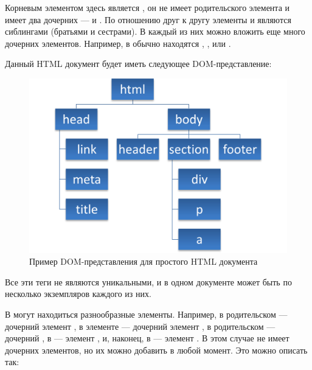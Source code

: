 
Корневым элементом здесь является , он не имеет родительского элемента и имеет два дочерних ---  и . По отношению друг к другу элементы  и  являются сиблингами (братьями и сестрами). В каждый из них можно вложить еще много дочерних элементов. Например, в  обычно находятся , ,  или .

Данный HTML документ будет иметь следующее DOM-представление:
 \clearpage

\begin{figure}[h]
	\centering
	\includegraphics[width=150mm]{img/simple-dom-1.png}
	\caption{Пример DOM-представления для простого HTML документа}
	\label{fig:simple-dom-1}
\end{figure}

Все эти теги не являются уникальными, и в одном документе может быть по несколько экземпляров каждого из них.

В  могут находиться разнообразные элементы. 
Например, в родительском  --- дочерний элемент , в элементе  --- дочерний элемент , в родительском  --- дочерний , в  --- элемент , и, наконец, в  — элемент . 
В этом случае  не имеет дочерних элементов, но их можно добавить в любой момент.
Это можно описать так:

